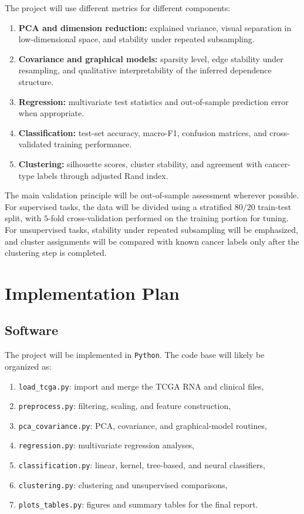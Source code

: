 \documentclass[12pt]{article}
\newcommand{\1}{\mathbf{1}}
\begin{document}
The project will use different metrics for different components:
\begin{enumerate}
    \item \textbf{PCA and dimension reduction:} explained variance, visual separation in low-dimensional space, and stability under repeated subsampling.
    \item \textbf{Covariance and graphical models:} sparsity level, edge stability under resampling, and qualitative interpretability of the inferred dependence structure.
    \item \textbf{Regression:} multivariate test statistics and out-of-sample prediction error when appropriate.
    \item \textbf{Classification:} test-set accuracy, macro-F1, confusion matrices, and cross-validated training performance.
    \item \textbf{Clustering:} silhouette scores, cluster stability, and agreement with cancer-type labels through adjusted Rand index.
\end{enumerate}

The main validation principle will be out-of-sample assessment wherever possible. For supervised tasks, the data will be divided using a stratified \(80/20\) train-test split, with \(5\)-fold cross-validation performed on the training portion for tuning. For unsupervised tasks, stability under repeated subsampling will be emphasized, and cluster assignments will be compared with known cancer labels only after the clustering step is completed.

\section{Implementation Plan}

\subsection{Software}

The project will be implemented in \texttt{Python}. The code base will likely be organized as:
\begin{enumerate}
    \item \texttt{load\_tcga.py}: import and merge the TCGA RNA and clinical files,
    \item \texttt{preprocess.py}: filtering, scaling, and feature construction,
    \item \texttt{pca\_covariance.py}: PCA, covariance, and graphical-model routines,
    \item \texttt{regression.py}: multivariate regression analyses,
    \item \texttt{classification.py}: linear, kernel, tree-based, and neural classifiers,
    \item \texttt{clustering.py}: clustering and unsupervised comparisons,
    \item \texttt{plots\_tables.py}: figures and summary tables for the final report.
\end{enumerate}
\end{document}
